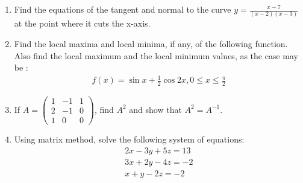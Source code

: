 \documentclass[10pt,-letter paper]{article}
\providecommand{\brak}[1]{\ensuremath{\left(#1\right)}}
\newcommand{\myvec}[1]{\ensuremath{\begin{pmatrix}#1\end{pmatrix}}}
\begin{document}
\begin{enumerate}
\item Find the equations of the tangent and normal to the curve $y = \frac{x-7}{\brak{x-2}\brak{x-3}}$ at the point where it cuts the x-axis.
\item Find the local maxima and local minima, if any, of the following function. Also find the local maximum and the local minimum values, as the case may be : 
	\begin{align*}
		f\brak{x} = \sin{x}+\frac{1}{2} \cos{2x}, 0\leq{x}\leq \frac{\pi}{2}
	\end{align*}
\item If $A=\myvec{1&-1&1 \\ 2&-1&0 \\ 1&0&0}$, find ${A}^2$ and show that ${A}^2 = A^{-1}$.
\item Using matrix method, solve the following system of equations:
	\begin{align*}
		2{x}-3{y}+5{z}=13 \\
		3{x}+2{y}-4{z}=-2 \\
		{x}+{y}-2{z}=-2
	\end{align*}
\end{enumerate}
\end{document}
